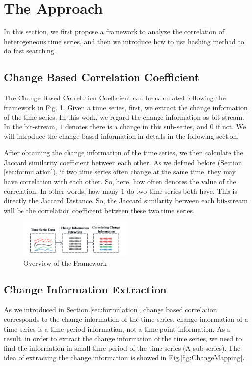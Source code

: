 \section{The Approach}
\label{sec:framework}
In this section, we first propose a framework to analyze the correlation of heterogeneous time series, and then we introduce how to use hashing method to do fast searching.

\subsection{Change Based Correlation Coefficient}

The Change Based Correlation Coefficient can be calculated following the framework in Fig. \ref{fig:frame}.
Given a time series, first, we extract the change information of the time series. 
In this work, we regard the change information as bit-stream. In the bit-stream, $1$ denotes there is a change in this sub-series, and $0$ if not. We will introduce the change based information in details in the following section.

After obtaining the change information of the time series, we then calculate the Jaccard similarity\cite{han2011data} coefficient between each other.
As we defined before (Section \ref{sec:formulation}), if two time series often change at the same time, they may have correlation with each other. 
So, here, how often denotes the value of the correlation. In other words, how many $1$ do two time series both have. This is directly the Jaccard Distance.
So, the Jaccard similarity between each bit-stream will be the correlation coefficient between these two time series. 

\begin{figure}[t]
\centering
\includegraphics[width=0.5\textwidth]{framework.pdf}
\caption{Overview of the Framework}
\label{fig:frame}
\end{figure}

\subsection{Change Information Extraction}
\label{ChangeCorrelation}

As we introduced in Section.\ref{sec:formulation}, change based correlation corresponds to the change information of the time series. change information of a time series is a time period information, not a time point information. 
As a result, in order to extract the change information of the time series, we need to find the information in small time period of the time series (A sub-series). The idea of extracting the change information is showed in Fig.\ref{fig:ChangeMapping}.

